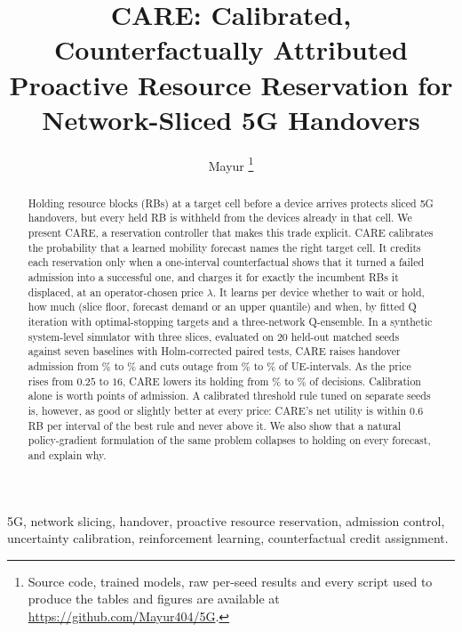 \documentclass[journal]{IEEEtran}
\title{CARE: Calibrated, Counterfactually Attributed Proactive Resource Reservation for Network-Sliced 5G Handovers}
\author{Mayur%
\thanks{Source code, trained models, raw per-seed results and every script used to produce the tables and figures are available at \url{https://github.com/Mayur404/5G}.}}
\begin{document}
\maketitle

\begin{abstract}
Holding resource blocks (RBs) at a target cell before a device arrives protects sliced 5G handovers, but every held RB is withheld from the devices already in that cell. We present CARE, a reservation controller that makes this trade explicit. CARE calibrates the probability that a learned mobility forecast names the right target cell. It credits each reservation only when a one-interval counterfactual shows that it turned a failed admission into a successful one, and charges it for exactly the incumbent RBs it displaced, at an operator-chosen price $\lambda$. It learns per device whether to wait or hold, how much (slice floor, forecast demand or an upper quantile) and when, by fitted Q iteration with optimal-stopping targets and a three-network Q-ensemble. In a synthetic system-level simulator with three slices, evaluated on 20 held-out matched seeds against seven baselines with Holm-corrected paired tests, CARE raises handover admission from \NoResHSR\% to \CareHSR\% and cuts outage from \NoResOutage\% to \CareOutage\% of UE-intervals. As the price rises from $0.25$ to $16$, CARE lowers its holding from \LamQuarterCareHold\% to \LamSixteenCareHold\% of decisions. Calibration alone is worth \VsCareUncalHSRDiff{} points of admission. A calibrated threshold rule tuned on separate seeds is, however, as good or slightly better at every price: CARE's net utility is within $0.6$ RB per interval of the best rule and never above it. We also show that a natural policy-gradient formulation of the same problem collapses to holding on every forecast, and explain why.
\end{abstract}

\begin{IEEEkeywords}
5G, network slicing, handover, proactive resource reservation, admission control, uncertainty calibration, reinforcement learning, counterfactual credit assignment.
\end{IEEEkeywords}
\end{document}
